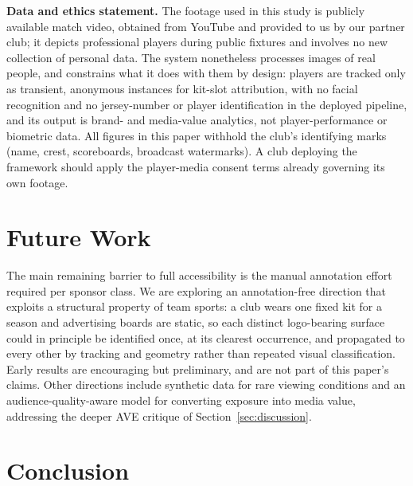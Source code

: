\documentclass[conference,a4paper]{IEEEtran}
\begin{document}
\textbf{Data and ethics statement.} The footage used in this study is publicly
available match video, obtained from YouTube and provided to us by our partner club;
it depicts professional players during public fixtures and involves no new collection
of personal data. The system nonetheless processes images of real people, and
constrains what it does with them by design: players are tracked only as transient,
anonymous instances for kit-slot attribution, with no facial recognition and no
jersey-number or player identification in the deployed pipeline, and its output is
brand- and media-value analytics, not player-performance or biometric data. All
figures in this paper withhold the club's identifying marks (name, crest, scoreboards,
broadcast watermarks). A club deploying the framework should apply the player-media
consent terms already governing its own footage.

\section{Future Work}
\label{sec:future}

The main remaining barrier to full accessibility is the manual annotation effort
required per sponsor class. We are exploring an annotation-free direction that exploits
a structural property of team sports: a club wears one fixed kit for a season and
advertising boards are static, so each distinct logo-bearing surface could in principle
be identified once, at its clearest occurrence, and propagated to every other by
tracking and geometry rather than repeated visual classification. Early results are
encouraging but preliminary, and are not part of this paper's claims. Other directions
include synthetic data for rare viewing conditions and an audience-quality-aware model
for converting exposure into media value, addressing the deeper AVE critique of
Section~\ref{sec:discussion}.

\section{Conclusion}
\label{sec:conclusion}
\end{document}
